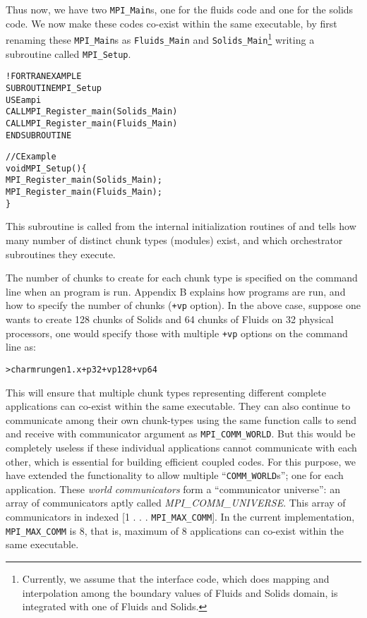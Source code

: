\documentclass[10pt]{article}
\begin{document}
Thus now, we have two \texttt{MPI\_Main}s, one for the fluids code and one for
the solids code. We now make these codes co-exist within the same executable,
by first renaming these \texttt{MPI\_Main}s as \texttt{Fluids\_Main} and
\texttt{Solids\_Main}\footnote{Currently, we assume that the interface code,
which does mapping and interpolation among the boundary values of Fluids and
Solids domain, is integrated with one of Fluids and Solids.} writing a
subroutine called \texttt{MPI\_Setup}.

\begin{alltt}
!FORTRAN EXAMPLE
SUBROUTINE MPI_Setup
  USE ampi
  CALL MPI_Register_main(Solids_Main)
  CALL MPI_Register_main(Fluids_Main)
END SUBROUTINE

//C Example
void MPI_Setup()\{
  MPI_Register_main(Solids_Main);
  MPI_Register_main(Fluids_Main);
\}
\end{alltt}

This subroutine is called from the internal initialization routines of \ampi{}
and tells \ampi{} how many number of distinct chunk types (modules) exist, and
which orchestrator subroutines they execute.

The number of chunks to create for each chunk type is specified on the command
line when an \ampi{} program is run. Appendix B explains how \ampi{} programs
are run, and how to specify the number of chunks (\verb|+vp| option). In the
above case, suppose one wants to create 128 chunks of Solids and 64 chunks of
Fluids on 32 physical processors, one would specify those with multiple
\verb|+vp| options on the command line as:

\begin{alltt}
> charmrun gen1.x +p 32 +vp 128 +vp 64
\end{alltt}

This will ensure that multiple chunk types representing different complete
applications can co-exist within the same executable. They can also continue to
communicate among their own chunk-types using the same \ampi{} function calls
to send and receive with communicator argument as \texttt{MPI\_COMM\_WORLD}.
But this would be completely useless if these individual applications cannot
communicate with each other, which is essential for building efficient coupled
codes.  For this purpose, we have extended the \ampi{} functionality to allow
multiple ``\texttt{COMM\_WORLD}s''; one for each application. These \emph{world
communicators} form a ``communicator universe'': an array of communicators
aptly called \emph{MPI\_COMM\_UNIVERSE}. This array of communicators in
indexed [1 . . . \texttt{MPI\_MAX\_COMM}]. In the current implementation,
\texttt{MPI\_MAX\_COMM} is 8, that is, maximum of 8 applications can co-exist
within the same executable.
\end{document}
